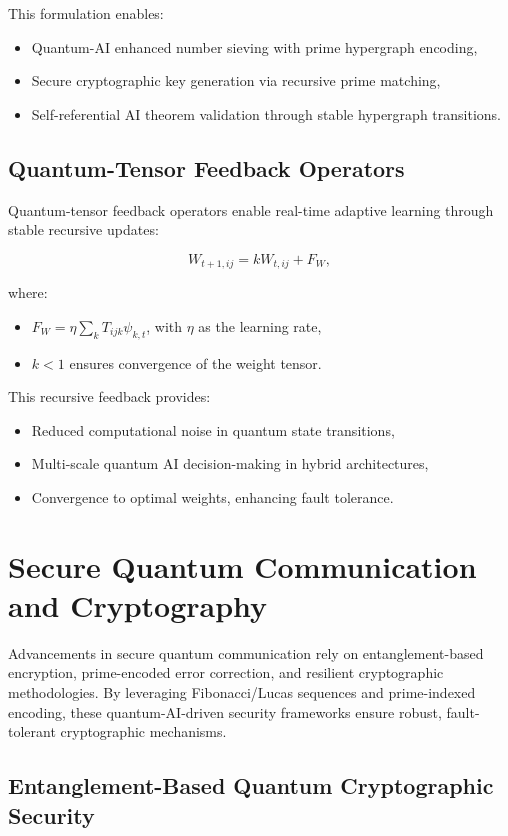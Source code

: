 \documentclass{article}
\theoremstyle{plain}
\begin{document}
This formulation enables:
\begin{itemize}
    \item Quantum-AI enhanced number sieving with prime hypergraph encoding,
    \item Secure cryptographic key generation via recursive prime matching,
    \item Self-referential AI theorem validation through stable hypergraph transitions.
\end{itemize}

\subsection{Quantum-Tensor Feedback Operators}
Quantum-tensor feedback operators enable real-time adaptive learning through stable recursive updates:

\[
W_{t+1,ij} = k W_{t,ij} + F_W,
\]

where:
\begin{itemize}
    \item \( F_W = \eta \sum_{k} T_{ijk} \psi_{k,t} \), with \( \eta \) as the learning rate,
    \item \( k < 1 \) ensures convergence of the weight tensor.
\end{itemize}

This recursive feedback provides:
\begin{itemize}
    \item Reduced computational noise in quantum state transitions,
    \item Multi-scale quantum AI decision-making in hybrid architectures,
    \item Convergence to optimal weights, enhancing fault tolerance.
\end{itemize}


\section{Secure Quantum Communication and Cryptography}

Advancements in secure quantum communication rely on entanglement-based encryption, prime-encoded error correction, and resilient cryptographic methodologies. By leveraging Fibonacci/Lucas sequences and prime-indexed encoding, these quantum-AI-driven security frameworks ensure robust, fault-tolerant cryptographic mechanisms.

\subsection{Entanglement-Based Quantum Cryptographic Security}
\end{document}

